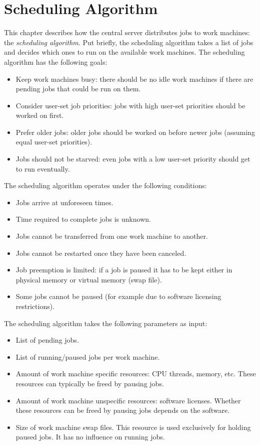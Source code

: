 \chapter{Scheduling Algorithm}
This chapter describes how the central server distributes jobs to work machines: the \textit{scheduling algorithm}.
Put briefly, the scheduling algorithm takes a list of jobs and decides which ones to run on the available work machines.
The scheduling algorithm has the following goals:
\begin{itemize}
  \item Keep work machines busy: there should be no idle work machines if there are pending jobs that could be run on them.
  \item Consider user-set job priorities: jobs with high user-set priorities should be worked on first.
  \item Prefer older jobs: older jobs should be worked on before newer jobs (assuming equal user-set priorities).
  \item Jobs should not be starved: even jobs with a low user-set priority should get to run eventually.
\end{itemize}
The scheduling algorithm operates under the following conditions:
\begin{itemize}
  \item Jobs arrive at unforeseen times.
  \item Time required to complete jobs is unknown.
  \item Jobs cannot be transferred from one work machine to another.
  \item Jobs cannot be restarted once they have been canceled.
  \item Job preemption is limited: if a job is paused it has to be kept either in physical memory or virtual memory (swap file).
  \item Some jobs cannot be paused (for example due to software licensing restrictions).
\end{itemize}
The scheduling algorithm takes the following parameters as input:
\begin{itemize}
  \item List of pending jobs.
  \item List of running/paused jobs per work machine.
  \item Amount of work machine specific resources: CPU threads, memory, etc.
  These resources can typically be freed by pausing jobs.
  \item Amount of work machine unspecific resources: software licenses.
  Whether these resources can be freed by pausing jobs depends on the software.
  \item Size of work machine swap files.
  This resource is used exclusively for holding paused jobs.
  It has no influence on running jobs.
\end{itemize}
